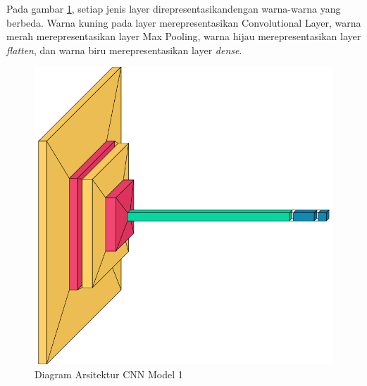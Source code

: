 Pada gambar \ref{fig:arsitekturcnngambar}, setiap jenis layer direpresentasikandengan warna-warna yang berbeda. Warna kuning pada layer merepresentasikan Convolutional Layer, warna merah merepresentasikan layer Max Pooling, warna hijau merepresentasikan layer \emph{flatten}, dan warna biru merepresentasikan layer \emph{dense}.
\begin{figure}[H]
  \centering
  \includegraphics[scale=0.4]{gambar/arsitekturcnngambar.png}
  \caption{Diagram Arsitektur CNN Model 1}
  \label{fig:arsitekturcnngambar}
\end{figure}

